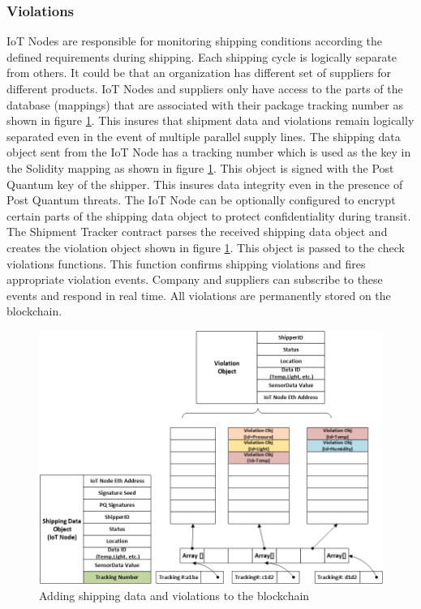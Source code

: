 \subsubsection{Violations} \label{SV} 
IoT Nodes are responsible for monitoring shipping conditions according the defined requirements during shipping. Each shipping cycle is logically separate from others. It could be that an organization has different set of suppliers for different products. IoT Nodes and suppliers only have access to the parts of the database (mappings) that are associated with their package tracking number as shown in figure \ref{fig:violation-impl}. This insures that shipment data and violations remain logically separated even in the event of multiple parallel supply lines. The shipping data object sent from the IoT Node has a tracking number which is used as the key in the Solidity mapping as shown in figure \ref{fig:violation-impl}. This object is signed with the Post Quantum key of the shipper. This insures data integrity even in the presence of Post Quantum threats. The IoT Node can be optionally configured to encrypt certain parts of the shipping data object to protect confidentiality during transit. The Shipment Tracker contract parses the received shipping data object and creates the violation object shown in figure \ref{fig:violation-impl}. This object is passed to the check violations functions. This function confirms shipping violations and fires appropriate violation events. Company and suppliers can subscribe to these events and respond in real time. All violations are permanently stored on the blockchain.
\vspace{1mm}
\begin{figure}[!h]
	\centering
    \includegraphics[width=150mm,scale=1]{figs/violation-impl}
	\caption{Adding shipping data and violations to the blockchain}
	\label{fig:violation-impl} 
\end{figure} 
\clearpage
